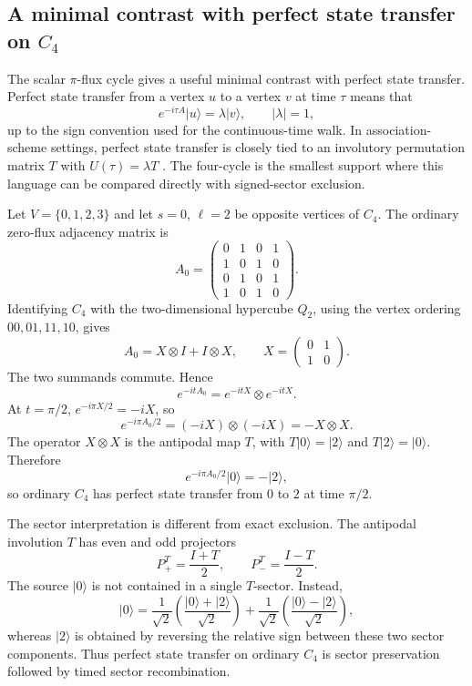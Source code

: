 \documentclass[11pt]{article}
\theoremstyle{definition}
\begin{document}
\subsection{A minimal contrast with perfect state transfer on $C_4$}
The scalar $\pi$-flux cycle gives a useful minimal contrast with perfect state transfer.  Perfect state transfer from a vertex $u$ to a vertex $v$ at time $\tau$ means that
\[
e^{-i\tau A}|u\rangle=\lambda |v\rangle,
\qquad |\lambda|=1,
\]
up to the sign convention used for the continuous-time walk.  In association-scheme settings, perfect state transfer is closely tied to an involutory permutation matrix $T$ with $U(\tau)=\lambda T$ \citep{Coutinho2015}.  The four-cycle is the smallest support where this language can be compared directly with signed-sector exclusion.

Let $V=\{0,1,2,3\}$ and let $s=0$, $\ell=2$ be opposite vertices of $C_4$.  The ordinary zero-flux adjacency matrix is
\[
A_0=
\begin{pmatrix}
0&1&0&1\\
1&0&1&0\\
0&1&0&1\\
1&0&1&0
\end{pmatrix}.
\]
Identifying $C_4$ with the two-dimensional hypercube $Q_2$, using the vertex ordering $00,01,11,10$, gives
\[
A_0=X\otimes I+I\otimes X,
\qquad
X=\begin{pmatrix}0&1\\1&0\end{pmatrix}.
\]
The two summands commute.  Hence
\[
e^{-itA_0}=e^{-itX}\otimes e^{-itX}.
\]
At $t=\pi/2$, $e^{-i\pi X/2}=-iX$, so
\[
e^{-i\pi A_0/2}=(-iX)\otimes(-iX)=-X\otimes X.
\]
The operator $X\otimes X$ is the antipodal map $T$, with $T|0\rangle=|2\rangle$ and $T|2\rangle=|0\rangle$.  Therefore
\[
e^{-i\pi A_0/2}|0\rangle=-|2\rangle,
\]
so ordinary $C_4$ has perfect state transfer from $0$ to $2$ at time $\pi/2$.

The sector interpretation is different from exact exclusion.  The antipodal involution $T$ has even and odd projectors
\[
P_+^T=\frac{I+T}{2},
\qquad
P_-^T=\frac{I-T}{2}.
\]
The source $|0\rangle$ is not contained in a single $T$-sector.  Instead,
\[
|0\rangle=\frac{1}{\sqrt2}\left(\frac{|0\rangle+|2\rangle}{\sqrt2}\right)+
\frac{1}{\sqrt2}\left(\frac{|0\rangle-|2\rangle}{\sqrt2}\right),
\]
whereas $|2\rangle$ is obtained by reversing the relative sign between these two sector components.  Thus perfect state transfer on ordinary $C_4$ is sector preservation followed by timed sector recombination.
\end{document}
